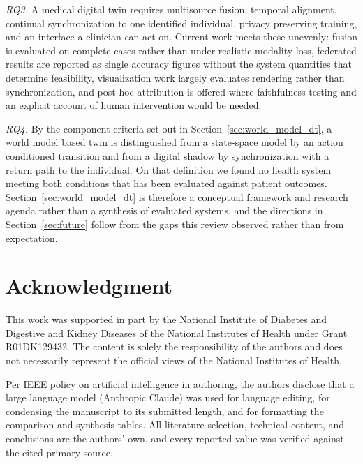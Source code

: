 \documentclass[journal]{IEEEtran}
\begin{document}
\emph{RQ3.} A medical digital twin requires multisource fusion, temporal alignment, continual synchronization to one identified individual, privacy preserving training, and an interface a clinician can act on. Current work meets these unevenly: fusion is evaluated on complete cases rather than under realistic modality loss, federated results are reported as single accuracy figures without the system quantities that determine feasibility, visualization work largely evaluates rendering rather than synchronization, and post-hoc attribution is offered where faithfulness testing and an explicit account of human intervention would be needed.

\emph{RQ4.} By the component criteria set out in Section~\ref{sec:world_model_dt}, a world model based twin is distinguished from a state-space model by an action conditioned transition and from a digital shadow by synchronization with a return path to the individual. On that definition we found no health system meeting both conditions that has been evaluated against patient outcomes. Section~\ref{sec:world_model_dt} is therefore a conceptual framework and research agenda rather than a synthesis of evaluated systems, and the directions in Section~\ref{sec:future} follow from the gaps this review observed rather than from expectation.

\fi

\section*{Acknowledgment}
This work was supported in part by the National Institute of Diabetes and Digestive and Kidney Diseases of the National Institutes of Health under Grant R01DK129432. The content is solely the responsibility of the authors and does not necessarily represent the official views of the National Institutes of Health.

Per IEEE policy on artificial intelligence in authoring, the authors disclose that a large language model (Anthropic Claude) was used for language editing, for condensing the manuscript to its submitted length, and for formatting the comparison and synthesis tables. All literature selection, technical content, and conclusions are the authors' own, and every reported value was verified against the cited primary source.



\end{document}
